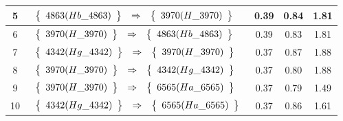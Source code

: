 \begin{longtable}{| c | l | c | c | c |}
5 & $\begin{array}{c c c}\left\{\begin{array}{c}4863 (Hb\_4863)\end{array}\right\} & \Rightarrow & \left\{\begin{array}{c}3970 (H\_3970)\end{array}\right\}\end{array}$ & 0.39 & 0.84 & 1.81 \\ \hline
6 & $\begin{array}{c c c}\left\{\begin{array}{c}3970 (H\_3970)\end{array}\right\} & \Rightarrow & \left\{\begin{array}{c}4863 (Hb\_4863)\end{array}\right\}\end{array}$ & 0.39 & 0.83 & 1.81 \\ \hline
7 & $\begin{array}{c c c}\left\{\begin{array}{c}4342 (Hg\_4342)\end{array}\right\} & \Rightarrow & \left\{\begin{array}{c}3970 (H\_3970)\end{array}\right\}\end{array}$ & 0.37 & 0.87 & 1.88 \\ \hline
8 & $\begin{array}{c c c}\left\{\begin{array}{c}3970 (H\_3970)\end{array}\right\} & \Rightarrow & \left\{\begin{array}{c}4342 (Hg\_4342)\end{array}\right\}\end{array}$ & 0.37 & 0.80 & 1.88 \\ \hline
9 & $\begin{array}{c c c}\left\{\begin{array}{c}3970 (H\_3970)\end{array}\right\} & \Rightarrow & \left\{\begin{array}{c}6565 (Ha\_6565)\end{array}\right\}\end{array}$ & 0.37 & 0.79 & 1.49 \\ \hline
10 & $\begin{array}{c c c}\left\{\begin{array}{c}4342 (Hg\_4342)\end{array}\right\} & \Rightarrow & \left\{\begin{array}{c}6565 (Ha\_6565)\end{array}\right\}\end{array}$ & 0.37 & 0.86 & 1.61 \\ \hline

\end{longtable}
